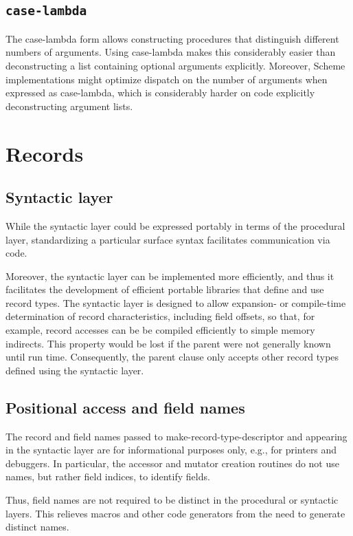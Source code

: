 \documentclass[twoside,twocolumn]{algol60}
\begin{document}
\section{{\tt case-lambda}}

The {\cf case-lambda} form allows constructing procedures that
distinguish different numbers of arguments.  Using {\cf case-lambda}
makes this considerably easier than deconstructing a list containing
optional arguments explicitly.  Moreover, Scheme implementations might
optimize dispatch on the number of arguments when expressed as {\cf
  case-lambda}, which is considerably harder on code explicitly
deconstructing argument lists.

\chapter{Records}


\section{Syntactic layer}

While the syntactic layer could be expressed portably in terms of the
procedural layer, standardizing a particular surface syntax
facilitates communication via code.

Moreover, the syntactic layer can be implemented more efficiently, and
thus it facilitates the development of efficient portable libraries
that define and use record types.  The syntactic layer is designed to
allow expansion- or compile-time determination of record
characteristics, including field offsets, so that, for example, record
accesses can be be compiled efficiently to simple memory indirects.
This property would be lost if the parent were not generally known
until run time.  Consequently, the {\cf parent} clause only accepts
other record types defined using the syntactic layer.

\section{Positional access and field names}

The record and field names passed to {\cf make-record-type-descriptor}
and appearing in the syntactic layer are for informational purposes
only, e.g., for printers and debuggers.  In particular, the accessor
and mutator creation routines do not use names, but rather field
indices, to identify fields.
  
Thus, field names are not required to be distinct in the procedural or
syntactic layers.  This relieves macros and other code generators from
the need to generate distinct names.
\end{document}
